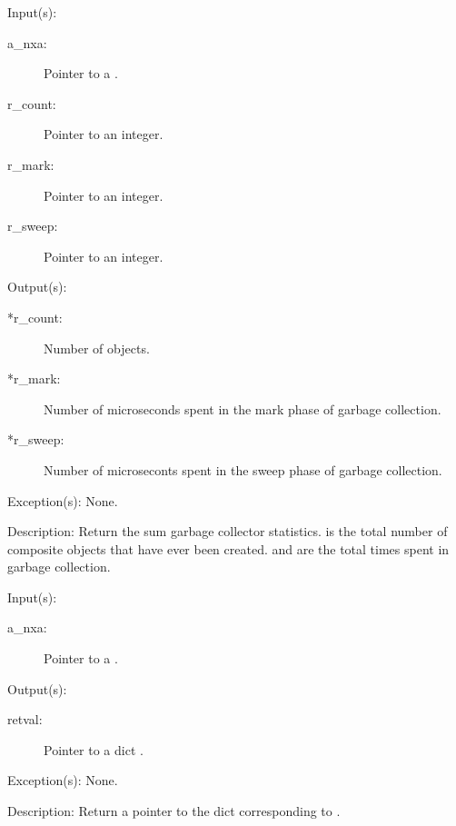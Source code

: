 \begin{capi}
	\begin{capilist}
	\item[Input(s): ]
		\begin{description}\item[]
		\item[a\_nxa: ]
			Pointer to a .
		\item[r\_count: ]
			Pointer to an integer.
		\item[r\_mark: ]
			Pointer to an integer.
		\item[r\_sweep: ]
			Pointer to an integer.
		\end{description}
	\item[Output(s): ]
		\begin{description}\item[]
		\item[*r\_count: ]
			Number of objects.
		\item[*r\_mark: ]
			Number of microseconds spent in the mark phase of
			garbage collection.
		\item[*r\_sweep: ]
			Number of microseconts spent in the sweep phase of
			garbage collection.
		\end{description}
	\item[Exception(s): ] None.
	\item[Description: ]
		Return the sum garbage collector statistics.
		 is the total number of composite objects that
		have ever been created.   and 
		are the total times spent in garbage collection.
	\end{capilist}
\label{nxa_gcdict_get}
	\begin{capilist}
	\item[Input(s): ]
		\begin{description}\item[]
		\item[a\_nxa: ]
			Pointer to a \classname{nxa}.
		\end{description}
	\item[Output(s): ]
		\begin{description}\item[]
		\item[retval: ]
			Pointer to a dict \classname{nxo}.
		\end{description}
	\item[Exception(s): ] None.
	\item[Description: ]
		Return a pointer to the dict  corresponding to
		\onyxop{gcdict}{}.
	\end{capilist}
\end{capi}

